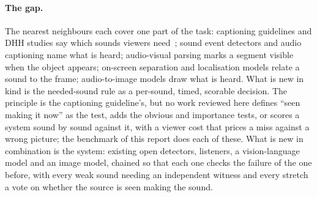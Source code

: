 \paragraph{The gap.} The nearest neighbours each cover one part of the task: captioning guidelines and DHH studies
say which sounds viewers need~\cite{dcmp,alonzo2022beyond,may2025choices}; sound event detectors and audio captioning
name what is heard; audio-visual parsing marks a segment visible when the object appears; on-screen separation and
localisation models relate a sound to the frame; audio-to-image models draw what is heard. What is new in kind is the
needed-sound rule as a per-sound, timed, scorable decision. The principle is the captioning guideline's, but no work
reviewed here defines ``seen making it now'' as the test, adds the obvious and importance tests, or scores a system
sound by sound against it, with a viewer cost that prices a miss against a wrong picture; the benchmark of this report
does each of these. What is new in combination is the system: existing open detectors, listeners, a vision-language model
and an image model, chained so that each one checks the failure of the one before, with every weak sound needing an
independent witness and every stretch a vote on whether the source is seen making the sound.
